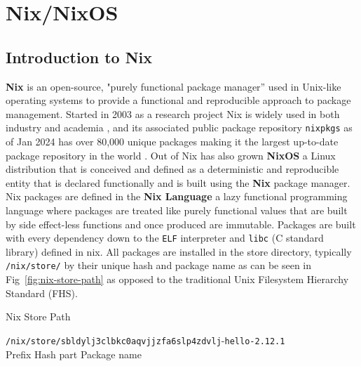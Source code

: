 \section{Nix/NixOS}
\subsection{Introduction to Nix}

\textbf{Nix} \cite{dolstra2004nix} is an open-source, "purely functional package manager” used in Unix-like operating systems to provide a functional and reproducible approach to package management. Started in 2003 as a research project Nix \cite{dolstra2006purely} is widely used in both industry \cite{NixCommunityNixOSWiki} and academia \cite{10.1145/3152493.3152556} \cite{https://doi.org/10.1002/qua.26872} \cite{LHCbNix}, and its associated public package repository \texttt{nixpkgs} \cite{NixPkgs} as of Jan 2024 has over 80,000 unique packages making it the largest up-to-date package repository in the world  \cite{Marakasov_2024}. Out of Nix has also grown \textbf{NixOS} \cite{10.1145/1411204.1411255} a Linux distribution that is conceived and defined as a deterministic and reproducible entity that is declared functionally and is built using the \textbf{Nix} package manager. \\

Nix packages are defined in the \textbf{Nix Language} a lazy functional programming language where packages are treated like purely functional values that are built by side effect-less functions and once produced are immutable. Packages are built with every dependency down to the \texttt{ELF} interpreter and \texttt{libc} (C standard library) defined in nix. All packages are installed in the store directory, typically \texttt{/nix/store/} by their unique hash and package name as can be seen in Fig~\ref{fig:nix-store-path} as opposed to the traditional Unix Filesystem Hierarchy Standard (FHS).

\begin{figureBox}[label={fig:nix-store-path}, width=0.8\linewidth]{Nix Store Path}
  \begin{tabbing}
    \={\color{Purple}\texttt{/nix/store/}}\={\color{RoyalBlue}\texttt{sbldylj3clbkc0aqvjjzfa6slp4zdvlj}}-\={\color{Orange}\texttt{hello-2.12.1}} \\
    \>\small{Prefix} \>\small {Hash part} \>\small {Package name}
  \end{tabbing}
\end{figureBox}

